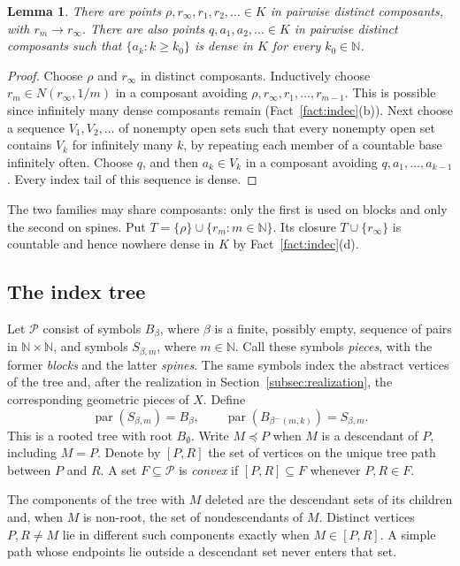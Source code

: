 \documentclass[11pt]{amsart}
\newtheorem{lemma}[theorem]{Lemma}
\theoremstyle{definition}
\theoremstyle{remark}
\newcommand{\pa}{\operatorname{par}}
\newcommand{\Pc}{\mathcal{P}}
\newcommand{\N}{\mathbb{N}}
\begin{document}
\begin{lemma}\label{lem:template}
There are points $\rho,r_\infty,r_1,r_2,\ldots\in K$ in pairwise distinct composants, with $r_m\to r_\infty$. There are also points $q,a_1,a_2,\ldots\in K$ in pairwise distinct composants such that $\{a_k:k\ge k_0\}$ is dense in $K$ for every $k_0\in\N$.
\end{lemma}

\begin{proof}
Choose $\rho$ and $r_\infty$ in distinct composants. Inductively choose $r_m\in N(r_\infty,1/m)$ in a composant avoiding $\rho,r_\infty,r_1,\dots,r_{m-1}$. This is possible since infinitely many dense composants remain (Fact~\ref{fact:indec}(b)). Next choose a sequence $V_1,V_2,\ldots$ of nonempty open sets such that every nonempty open set contains $V_k$ for infinitely many $k$, by repeating each member of a countable base infinitely often. Choose $q$, and then $a_k\in V_k$ in a composant avoiding $q,a_1,\dots,a_{k-1}$. Every index tail of this sequence is dense.
\end{proof}

The two families may share composants: only the first is used on blocks and only the second on spines. Put $T=\{\rho\}\cup\{r_m:m\in\N\}$. Its closure $T\cup\{r_\infty\}$ is countable and hence nowhere dense in $K$ by Fact~\ref{fact:indec}(d).

\subsection{The index tree}\label{subsec:tree}
Let $\Pc$ consist of symbols $B_\beta$, where $\beta$ is a finite, possibly empty, sequence of pairs in $\N\times\N$, and symbols $S_{\beta,m}$, where $m\in\N$. Call these symbols \emph{pieces}, with the former \emph{blocks} and the latter \emph{spines}. The same symbols index the abstract vertices of the tree and, after the realization in Section~\ref{subsec:realization}, the corresponding geometric pieces of $X$. Define
\[
\pa(S_{\beta,m})=B_\beta,\qquad \pa(B_{\beta^\frown(m,k)})=S_{\beta,m}.
\]
This is a rooted tree with root $B_\emptyset$. Write $M\preceq P$ when $M$ is a descendant of $P$, including $M=P$. Denote by $[P,R]$ the set of vertices on the unique tree path between $P$ and $R$. A set $F\subseteq\Pc$ is \emph{convex} if $[P,R]\subseteq F$ whenever $P,R\in F$.

The components of the tree with $M$ deleted are the descendant sets of its children and, when $M$ is non-root, the set of nondescendants of $M$. Distinct vertices $P,R\neq M$ lie in different such components exactly when $M\in[P,R]$. A simple path whose endpoints lie outside a descendant set never enters that set.
\end{document}
